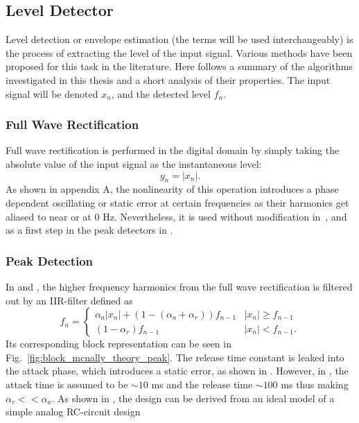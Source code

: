 \documentclass[../main2.tex]{subfiles}
\begin{document}
\subsection{Level Detector}\label{level_detection}
Level detection or envelope estimation (the terms will be used interchangeably) is the process of extracting the level of the input signal. Various methods have been proposed for this task in the literature. Here follows a summary of the algorithms investigated in this thesis and a short analysis of their properties. The input signal will be denoted $x_n$, and the detected level $f_n$.

\subsubsection{Full Wave Rectification}
Full wave rectification is performed in the digital domain by simply taking the absolute value of the input signal as the instantaneous level:
\begin{equation}
y_n = |x_n|.
\end{equation}
As shown in appendix A, the nonlinearity of this operation introduces a phase dependent oscillating or static error at certain frequencies as their harmonics get aliased to near or at 0 Hz. Nevertheless, it is used without modification in~\cite{reiss2012tutorial}, and as a first step in the peak detectors in \cite{mcnally1984dynamic} \cite{stikvoort1986digital}. 

\subsubsection{Peak Detection}
In \cite{mcnally1984dynamic} and \cite{zolzer1997digital}, the higher frequency harmonics from the full wave rectification is filtered out by an IIR-filter defined as
\begin{equation}
f_n = \begin{cases}
    \alpha_{a} |x_n| + (1- (\alpha_{a} + \alpha_{r})) f_{n-1}  	& |x_n| \geq f_{n-1} \\
    (1-\alpha_{r}) f_{n-1} 							& |x_n| < f_{n-1}.
\end{cases}
\end{equation}
Its corresponding block representation can be seen in Fig.~\ref{fig:block_mcnally_theory_peak}. The release time constant is leaked into the attack phase, which introduces a static error, as shown in \cite{reiss2012tutorial}. However, in \cite{mcnally1984dynamic}, the attack time is assumed to be $\sim 10$ ms and the release time   $\sim 100$ ms thus making $\alpha_r << \alpha_a$. As shown in \cite{reiss2012tutorial}, the design can be derived from an ideal model of a simple analog RC-circuit design
\end{document}
